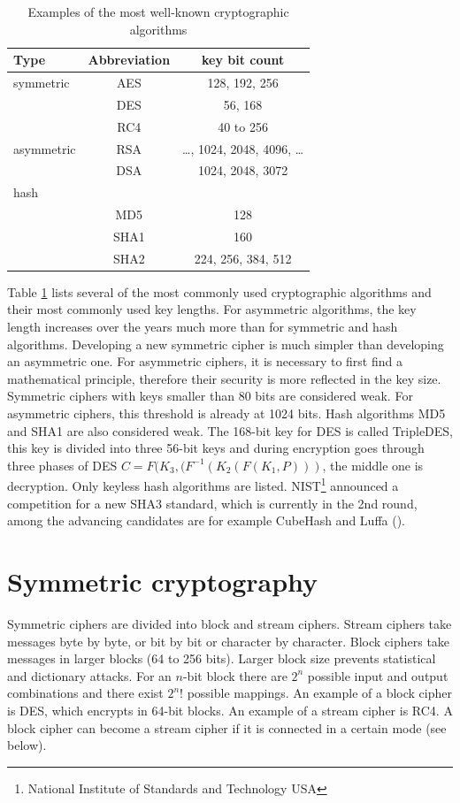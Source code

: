 \begin{table}[t]
\begin{center}
  \begin{tabular}{| l | c | c|}
  \hline
  Type & Abbreviation & key bit count \\ \hline
  symmetric & AES & 128, 192, 256\\ \hline
  ~ & DES & 56, 168 \\ \hline
  ~ & RC4 & 40 to 256 \\ \hline
  asymmetric & RSA & \dots, 1024, 2048, 4096, \dots \\ \hline
  ~ & DSA & 1024, 2048, 3072\\ \hline
  hash & & \\ \hline
  ~ & MD5 & 128\\ \hline
  ~ & SHA1 & 160\\ \hline
  ~ & SHA2 & 224, 256, 384, 512\\ \hline
  \end{tabular}
  \caption{Examples of the most well-known cryptographic algorithms}
  \label{cipherExamples}
\end{center}
\end{table}
Table \ref{cipherExamples} lists several of the most commonly used cryptographic algorithms and their
most commonly used key lengths. For asymmetric algorithms, the key length increases over the years
much more than for symmetric and hash algorithms. Developing a new symmetric cipher is much simpler than
developing an asymmetric one. For asymmetric ciphers, it is necessary to first find a mathematical principle, therefore their security
is more reflected in the key size. Symmetric ciphers with keys smaller than 80 bits are considered weak.
For asymmetric ciphers, this threshold is already at 1024 bits. Hash algorithms MD5 and SHA1 are also considered
weak.
The 168-bit key for DES is called TripleDES,
this key is divided into three 56-bit keys and during encryption goes through three phases of DES
$C = F(K_3,(F^{-1}(K_2(F(K_1, P)))$, the middle one is decryption. Only keyless hash algorithms are listed.
NIST\footnote{National Institute of Standards and Technology USA} announced a competition for a new SHA3 standard,
which is currently in the 2nd round, among the advancing candidates are for example
CubeHash and Luffa (\cite{specLuffa}).

\section{Symmetric cryptography}
Symmetric ciphers are divided into block and stream ciphers.
Stream ciphers take messages byte by byte, or bit by bit or character by character. Block ciphers
take messages in larger blocks (64 to 256 bits). Larger block size prevents statistical
and dictionary attacks. For an $n$-bit block there are $2^n$ possible input and output combinations and
there exist $2^{n}!$ possible mappings.
An example of a block cipher is DES, which encrypts in 64-bit blocks. An example of a stream cipher
is RC4. A block cipher can become a stream cipher if it is connected in a certain mode (see below).

